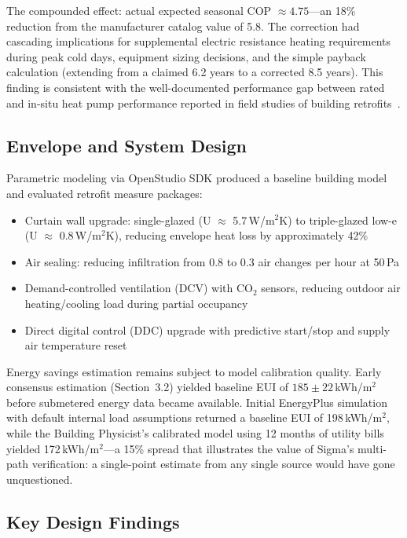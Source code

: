 \documentclass[11pt,a4paper]{article}
\begin{document}
The compounded effect: actual expected seasonal COP $\approx 4.75$---an 18\% reduction from the manufacturer catalog value of 5.8. The correction had cascading implications for supplemental electric resistance heating requirements during peak cold days, equipment sizing decisions, and the simple payback calculation (extending from a claimed 6.2 years to a corrected 8.5 years). This finding is consistent with the well-documented performance gap between rated and in-situ heat pump performance reported in field studies of building retrofits~\cite{energyplus}.

\subsection{Envelope and System Design}

Parametric modeling via OpenStudio SDK produced a baseline building model and evaluated retrofit measure packages:
\begin{itemize}
    \item Curtain wall upgrade: single-glazed (U $\approx$ 5.7\,W/m$^2$K) to triple-glazed low-e (U $\approx$ 0.8\,W/m$^2$K), reducing envelope heat loss by approximately 42\%
    \item Air sealing: reducing infiltration from 0.8 to 0.3 air changes per hour at 50\,Pa
    \item Demand-controlled ventilation (DCV) with CO$_2$ sensors, reducing outdoor air heating/cooling load during partial occupancy
    \item Direct digital control (DDC) upgrade with predictive start/stop and supply air temperature reset
\end{itemize}

Energy savings estimation remains subject to model calibration quality. Early consensus estimation (Section~3.2) yielded baseline EUI of $185 \pm 22$\,kWh/m$^2$ before submetered energy data became available. Initial EnergyPlus simulation with default internal load assumptions returned a baseline EUI of 198\,kWh/m$^2$, while the Building Physicist's calibrated model using 12 months of utility bills yielded 172\,kWh/m$^2$---a 15\% spread that illustrates the value of Sigma's multi-path verification: a single-point estimate from any single source would have gone unquestioned.

\subsection{Key Design Findings}
\end{document}
